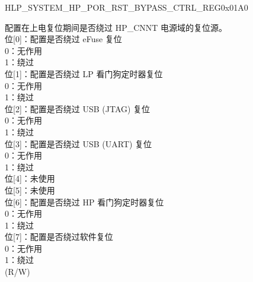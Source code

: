 \begin{register}{H}{LP\_SYSTEM\_HP\_POR\_RST\_BYPASS\_CTRL\_REG}{0x01A0}\label{regdesc:LPSYSTEMHPPORRSTBYPASSCTRLREG}
%
%
%
%
\regnewline%
\begin{regdesc}\begin{reglist}
\label{fielddesc:LPSYSTEMHPPOCNNTRSTNBYPASSCTRL}\item [LP\_SYSTEM\_HP\_PO\_CNNT\_RSTN\_BYPASS\_CTRL] 配置在上电复位期间是否绕过 HP\_CNNT 电源域的复位源。\\
位[0]：配置是否绕过 eFuse 复位\\
0：无作用\\
1：绕过\\
位[1]：配置是否绕过 LP 看门狗定时器复位\\
0：无作用\\
1：绕过\\
位[2]：配置是否绕过 USB (JTAG) 复位\\
0：无作用\\
1：绕过\\
位[3]：配置是否绕过 USB (UART) 复位\\
0：无作用\\
1：绕过\\
位[4]：未使用\\
位[5]：未使用\\
位[6]：配置是否绕过 HP 看门狗定时器复位\\
0：无作用\\
1：绕过\\
位[7]：配置是否绕过软件复位\\
0：无作用\\
1：绕过\\
(R/W)
\item [见下页...]
\end{reglist}\end{regdesc}
\end{register}
\addtocounter{Regfloat}{-1}


